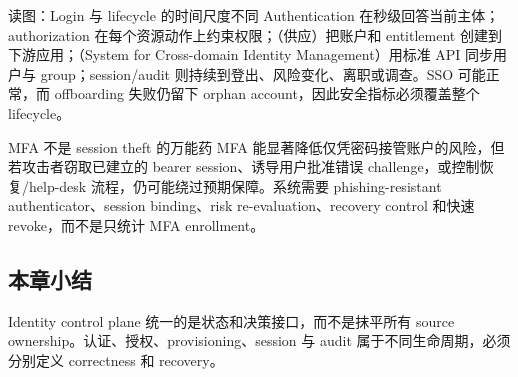 
\begin{knowledgebox}{读图：Login 与 lifecycle 的时间尺度不同}
Authentication 在秒级回答当前主体；authorization 在每个资源动作上约束权限；（供应）把账户和 entitlement 创建到下游应用；（System for Cross-domain Identity Management）用标准 API 同步用户与 group；session/audit 则持续到登出、风险变化、离职或调查。SSO 可能正常，而 offboarding 失败仍留下 orphan account，因此安全指标必须覆盖整个 lifecycle。
\end{knowledgebox}

\begin{warningbox}{MFA 不是 session theft 的万能药}
MFA 能显著降低仅凭密码接管账户的风险，但若攻击者窃取已建立的 bearer session、诱导用户批准错误 challenge，或控制恢复/help-desk 流程，仍可能绕过预期保障。系统需要 phishing-resistant authenticator、session binding、risk re-evaluation、recovery control 和快速 revoke，而不是只统计 MFA enrollment。
\end{warningbox}

\subsection{本章小结}

Identity control plane 统一的是状态和决策接口，而不是抹平所有 source ownership。认证、授权、provisioning、session 与 audit 属于不同生命周期，必须分别定义 correctness 和 recovery。

